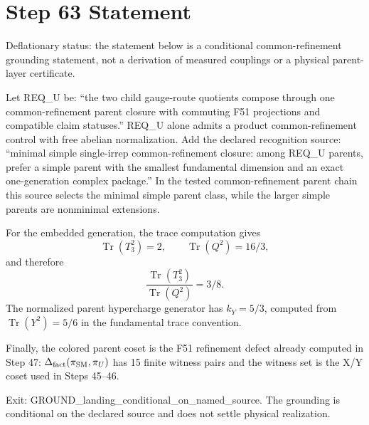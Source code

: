 \documentclass[11pt]{article}
\begin{document}
\section*{Step 63 Statement}
Deflationary status: the statement below is a conditional common-refinement grounding statement, not a derivation of measured couplings or a physical parent-layer certificate.

Let REQ\_U be: ``the two child gauge-route quotients compose through one common-refinement parent closure with commuting F51 projections and compatible claim statuses.'' REQ\_U alone admits a product common-refinement control with free abelian normalization. Add the declared recognition source: ``minimal simple single-irrep common-refinement closure: among REQ_U parents, prefer a simple parent with the smallest fundamental dimension and an exact one-generation complex package.'' In the tested common-refinement parent chain this source selects the minimal simple parent class, while the larger simple parents are nonminimal extensions.

For the embedded generation, the trace computation gives
\[
\operatorname{Tr}(T_3^2)=2,\qquad
\operatorname{Tr}(Q^2)=16/3,
\]
and therefore
\[
\frac{\operatorname{Tr}(T_3^2)}{\operatorname{Tr}(Q^2)}=3/8.
\]
The normalized parent hypercharge generator has \(k_Y=5/3\), computed from \(\operatorname{Tr}(Y^2)=5/6\) in the fundamental trace convention.

Finally, the colored parent coset is the F51 refinement defect already computed in Step 47: \(\Delta_{\rm fact}(\pi_{\rm SM},\pi_U)\) has 15 finite witness pairs and the witness set is the X/Y coset used in Steps 45--46.

Exit: GROUND_landing_conditional_on_named_source. The grounding is conditional on the declared source and does not settle physical realization.
\end{document}
